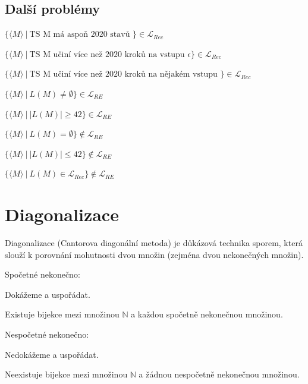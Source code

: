 \subsection*{Další problémy} \begin{compactitem}
    \item $ \{ \langle M \rangle ~|~ \text{TS M má aspoň 2020 stavů } \} \in \mathcal{L}_{Rec}$

    \item $ \{ \langle M \rangle ~|~ \text{TS M učiní více než 2020 kroků na vstupu } \epsilon \} \in \mathcal{L}_{Rec}$

    \item $ \{ \langle M \rangle ~|~ \text{TS M učiní více než 2020 kroků na nějakém vstupu } \} \in \mathcal{L}_{Rec}$

    \item $ \{ \langle M \rangle ~|~ L(M) \not= \emptyset \} \in \mathcal{L}_{RE}$

    \item $ \{ \langle M \rangle ~|~ |L(M)| \geq 42 \} \in \mathcal{L}_{RE}$

    \item $ \{ \langle M \rangle ~|~ L(M) = \emptyset \} \not\in \mathcal{L}_{RE}$

    \item $ \{ \langle M \rangle ~|~ |L(M)| \leq 42 \} \not\in \mathcal{L}_{RE}$

    \item $ \{ \langle M \rangle ~|~ L(M) \in \mathcal{L}_{Rec} \} \not\in \mathcal{L}_{RE}$
\end{compactitem}


\section{Diagonalizace}

\begin{compactitem}
    \item Diagonalizace (Cantorova diagonální metoda) je důkázová technika sporem, která slouží k porovnání mohutnosti dvou množin (zejména dvou nekonečných množin).

    \item Spočetné nekonečno: \begin{compactitem}
        \item Dokážeme  a uspořádat.
        \item Existuje bijekce mezi množinou $\mathbb{N}$ a každou spočetně nekonečnou množinou.
    \end{compactitem}

    \item Nespočetné nekonečno: \begin{compactitem}
        \item Nedokážeme  a uspořádat.
        \item Neexistuje bijekce mezi množinou $\mathbb{N}$ a žádnou nespočetně nekonečnou množinou.
    \end{compactitem}
\end{compactitem}

